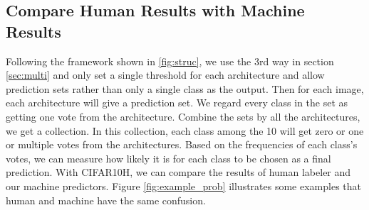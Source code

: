 \documentclass{article}
\begin{document}
\subsection{Compare Human Results with Machine Results}
Following the framework shown in \ref{fig:struc}, we use the 3rd way in section \ref{sec:multi} and only set a single threshold for each architecture and allow prediction sets rather than only a single class as the output. Then for each image, each architecture will give a prediction set. We regard every class in the set as getting one vote from the architecture. Combine the sets by all the architectures, we get a collection. In this collection, each class among the 10 will get zero or one or multiple votes from the architectures. Based on the frequencies of each class's votes, we can measure how likely it is for each class to be chosen as a final prediction. With CIFAR10H, we can compare the results of human labeler and our machine predictors. Figure \ref{fig:example_prob} illustrates some examples that human and machine have the same confusion.
\end{document}
